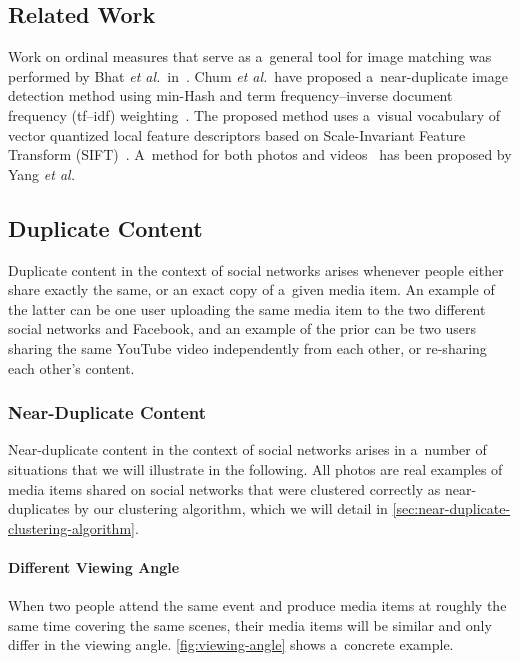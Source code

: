 \subsection{Related Work}

Work on ordinal measures that serve as a~general tool for
image matching was performed by Bhat \emph{et al.}\
in~\cite{bhat1998imagecorrespondence}.
Chum \emph{et al.}\ have proposed a~near-duplicate image detection method
using min-Hash and term frequency--inverse document frequency (tf--idf)
weighting~\cite{chum2008nearduplicate}.
The proposed method uses a~visual vocabulary of
vector quantized local feature descriptors based on
Scale-Invariant Feature Transform (SIFT)~\cite{lowe1999sift}.
A~method for both photos and videos~\cite{yang2009nearduplicate}
has been proposed by Yang \emph{et al.}

\subsection{Duplicate Content}
\label{sec:duplicate-content}

Duplicate content in the context of social networks
arises whenever people either share exactly the same,
or an exact copy of a~given media item.
An example of the latter can be one user uploading the same media item
to the two different social networks \googleplus and Facebook,
and an example of the prior can be two users sharing the same
YouTube video independently from each other, or re-sharing each other's content.

\subsubsection{Near-Duplicate Content}

Near-duplicate content in the context of social networks
arises in a~number of situations
that we will illustrate in the following.
All photos are real examples of media items shared on social networks
that were clustered correctly as near-duplicates
by our clustering algorithm, which we will detail in
\autoref{sec:near-duplicate-clustering-algorithm}.

\paragraph{Different Viewing Angle}

When two people attend the same event
and produce media items at roughly the same time
covering the same scenes,
their media items will be similar
and only differ in the viewing angle. 
\autoref{fig:viewing-angle} shows a~concrete example.

